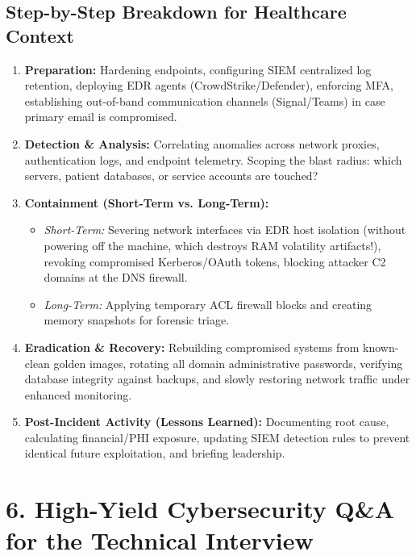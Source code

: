 \documentclass[10pt,a4paper]{article}
\begin{document}
\subsection{Step-by-Step Breakdown for Healthcare Context}
\begin{enumerate}
    \item \textbf{Preparation:} Hardening endpoints, configuring SIEM centralized log retention, deploying EDR agents (CrowdStrike/Defender), enforcing MFA, establishing out-of-band communication channels (Signal/Teams) in case primary email is compromised.
    \item \textbf{Detection \& Analysis:} Correlating anomalies across network proxies, authentication logs, and endpoint telemetry. Scoping the blast radius: which servers, patient databases, or service accounts are touched?
    \item \textbf{Containment (Short-Term vs. Long-Term):}
    \begin{itemize}[noitemsep]
        \item \textit{Short-Term:} Severing network interfaces via EDR host isolation (without powering off the machine, which destroys RAM volatility artifacts!), revoking compromised Kerberos/OAuth tokens, blocking attacker C2 domains at the DNS firewall.
        \item \textit{Long-Term:} Applying temporary ACL firewall blocks and creating memory snapshots for forensic triage.
    \end{itemize}
    \item \textbf{Eradication \& Recovery:} Rebuilding compromised systems from known-clean golden images, rotating all domain administrative passwords, verifying database integrity against backups, and slowly restoring network traffic under enhanced monitoring.
    \item \textbf{Post-Incident Activity (Lessons Learned):} Documenting root cause, calculating financial/PHI exposure, updating SIEM detection rules to prevent identical future exploitation, and briefing leadership.
\end{enumerate}

\section{6. High-Yield Cybersecurity Q\&A for the Technical Interview}
\end{document}

